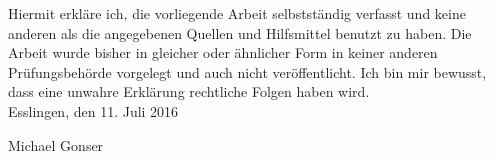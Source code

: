 
Hiermit erkläre ich, die vorliegende Arbeit selbstständig verfasst und keine anderen als die angegebenen Quellen und Hilfsmittel benutzt zu haben. Die Arbeit wurde bisher in gleicher oder ähnlicher Form in keiner anderen Prüfungsbehörde vorgelegt und auch nicht veröffentlicht. Ich bin mir bewusst, dass eine unwahre Erklärung rechtliche Folgen haben wird.\\

\vspace{1cm}
Esslingen, den 11. Juli 2016 \\
\begin{flushright}
Michael Gonser
\end{flushright}

